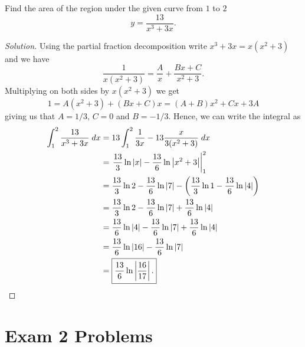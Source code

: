 \begin{problem}[WebAssign, HW 14, \# 5]
Find the area of the region under the given curve from $1$ to $2$
\[
y=\frac{13}{x^3+3x}.
\]
\end{problem}
\begin{proof}[Solution]
Using the partial fraction decomposition write $x^3+3x=x(x^2+3)$ and we
have
\[
\frac{1}{x(x^2+3)}=\frac{A}{x}+\frac{Bx+C}{x^2+3}.
\]
Multiplying on both sides by $x(x^2+3)$ we get
\[
1=A(x^2+3)+(Bx+C)x=(A+B)x^2+Cx+3A
\]
giving us that $A=1/3$, $C=0$ and $B=-1/3$. Hence, we can write the
integral as
\begin{align*}
\int_1^2\frac{13}{x^3+3x}\;dx
&=13\int_1^2\frac{1}{3x}-13\frac{x}{3(x^2+3)}\;dx\\
&=\left.\frac{13}{3}\ln|x|-\frac{13}{6}\ln\left|x^2+3\right|\right|_1^2\\
&=\frac{13}{3}\ln 2-\frac{13}{6}\ln|7|
-\left(\frac{13}{3}\ln 1-\frac{13}{6}\ln|4|\right)\\
&=\frac{13}{3}\ln 2-\frac{13}{6}\ln|7|+\frac{13}{6}\ln|4|\\
&=\frac{13}{6}\ln|4|-\frac{13}{6}\ln|7|+\frac{13}{6}\ln|4|\\
&=\frac{13}{6}\ln|16|-\frac{13}{6}\ln|7|\\
&=\boxed{\frac{13}{6}\ln\left|\frac{16}{17}\right|.}\qedhere
\end{align*}
\end{proof}

\section{Exam 2 Problems}

